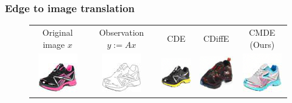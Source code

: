   \subsubsection{Edge to image translation}
  \begin{figure}[ht]
    \begin{center}
      \renewcommand{\arraystretch}{1.25}
      \begin{tabular}{ccccc}
        Original image $x$ & Observation $y := Ax$ & CDE & CDiffE & CMDE (Ours) \\
        
        \includegraphics[width=.12\textwidth]{Chapter2/samples/edges-to-shoes/table/1/x.png} &   
        \includegraphics[width=.12\textwidth]{Chapter2/samples/edges-to-shoes/table/1/y.png} &
        \includegraphics[width=.12\textwidth]{Chapter2/samples/edges-to-shoes/table/1/sr3.png} & 
        \includegraphics[width=.12\textwidth]{Chapter2/samples/edges-to-shoes/table/1/Song.png} & 
        \includegraphics[width=.12\textwidth]{Chapter2/samples/edges-to-shoes/table/1/DV.png} \\
        

\end{tabular}
\end{center}
\end{figure}
